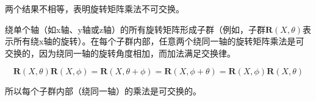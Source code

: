 \documentclass{homework}
\begin{document}
\begin{sol}
  两个结果不相等，表明旋转矩阵乘法不可交换。

  绕单个轴（如x轴、y轴或z轴）的所有旋转矩阵形成子群（例如，子群$ \mathbf{R}(X, \theta) $表示所有绕x轴的旋转）。在每个子群内部，任意两个绕同一轴的旋转矩阵乘法是可交换的，因为绕同一轴的旋转角度相加，而加法满足交换律。

  \[
    \mathbf{R}(X, \theta) \mathbf{R}(X, \phi) = \mathbf{R}(X, \theta + \phi) = \mathbf{R}(X, \phi + \theta) = \mathbf{R}(X, \phi) \mathbf{R}(X, \theta)
  \]

  所以每个子群内部（绕同一轴）的乘法是可交换的。
  
\end{sol}
\end{document}
